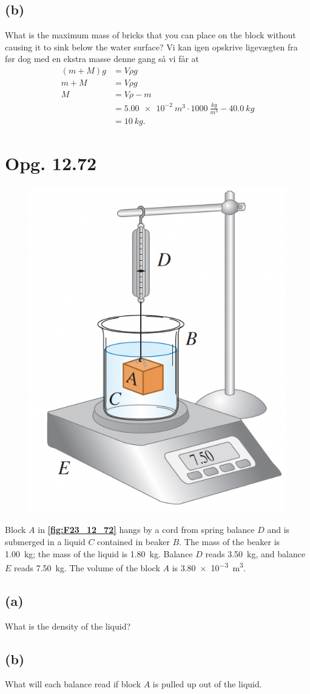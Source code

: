 \documentclass[12pt]{article}
\theoremstyle{definition}
\begin{document}
\subsection*{(b)}
What is the maximum mass of bricks that you can place on the block without causing it to sink below the water surface?
\bigbreak
Vi kan igen opskrive ligevægten fra før dog med en ekstra masse denne gang så vi får at
\begin{align*}
  (m + M)g &= V \rho g \\
  m + M &= V \rho g \\
  M &= V \rho - m \\
    &= \qty{5,00e-2}{m^3} \cdot \qty{1000}{\frac{kg}{m^3}} - \qty{40,0}{kg} \\ 
    &= \qty{10}{kg} 
.\end{align*}


\section*{Opg. 12.72}
\begin{figure} [ht]
  \centering
  \caption{}
  \includegraphics[width=0.3\linewidth]{../figures/F23_12_72.png}
  \label{fig:F23_12_72}
\end{figure}

Block $A$ in \textbf{\autoref{fig:F23_12_72}} hangs by a cord from spring balance $D$ and is submerged in a liquid $C$ contained in beaker $B$. The mass of the beaker is \qty{1,00}{kg}; the mass of the liquid is \qty{1,80}{kg}. Balance $D$ reads \qty{3,50}{kg}, and balance $E$ reads \qty{7,50}{kg}. The volume of the block $A$ is \qty{3,80e-3}{m^3}.

\subsection*{(a)}
What is the density of the liquid?

\subsection*{(b)}
What will each balance read if block $A$ is pulled up out of the liquid. 
\end{document}
